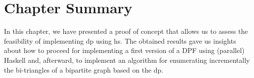 \section{Chapter Summary}
In this chapter, we have presented a proof of concept that allows us to assess the feasibility of implementing \acrshort{dp} using \acrshort{hs}. 
The obtained results gave us insights about how to proceed for implementing a first version of a DPF using (parallel) Haskell and, afterward, to implement an algorithm for enumerating incrementally the bi-triangles of a bipartite graph based on the  \acrshort{dp}.

